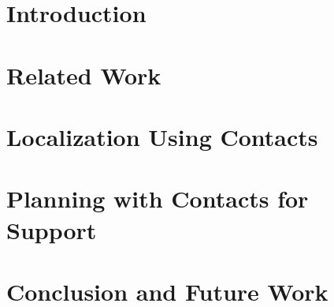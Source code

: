 \documentclass[hidelinks, 12pt]{cmuthesis}
\begin{document}
\chapter{Introduction}


\chapter{Related Work} \label{chap:related_work}


\chapter{Localization Using Contacts} \label{chap:localization}


\chapter{Planning with Contacts for Support} \label{chap:planning}


\chapter{Conclusion and Future Work}


%

\backmatter


\renewcommand{\bibsection}{\chapter{\bibname}}

\nocite{*}
\end{document}
